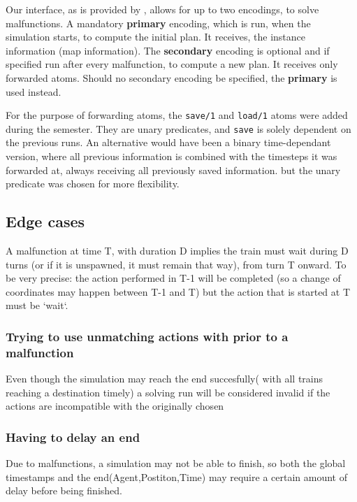 Our interface, as is provided by \cite{flatland}, allows for up to two encodings, to solve malfunctions. A mandatory \textbf{primary} encoding, which is run, when the simulation starts, to compute the initial plan. It receives, the instance information (map information). The \textbf{secondary} encoding is optional and if specified run after every malfunction, to compute a new plan. It receives only forwarded atoms. Should no secondary encoding be specified, the \textbf{primary} is used instead.

For the purpose of forwarding atoms, the \texttt{save/1} and \texttt{load/1} atoms were added during the semester\cite{malfunction_branch}. They are unary predicates, and \texttt{save} is solely dependent on the previous runs. An alternative would have been a binary time-dependant version, where all previous information is combined with the timesteps it was forwarded at, always receiving all previously saved information. \color{red} but the unary predicate was chosen for more flexibility.\color{black}

\subsection{Edge cases}
A malfunction at time T, with duration D implies the train must wait during D turns (or if it is unspawned, it must remain that way), from turn T onward. To be very precise: the action performed in T-1 will be completed (so a change of coordinates may happen between T-1 and T) but the action that is started at T must be `wait`.

\subsubsection {Trying to use unmatching actions with prior to a malfunction} Even though the simulation may reach the end succesfully( with all trains reaching a destination timely) a solving run will be considered invalid if the actions are incompatible with the originally chosen

\subsubsection {Having to delay an end} Due to malfunctions, a simulation may not be able to finish, so both the global timestamps and the end(Agent,Postiton,Time) may require a certain amount of delay before being finished.

